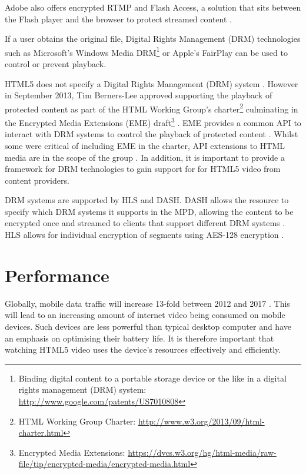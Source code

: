 \documentclass[journal]{IEEEtran}
\begin{document}
Adobe also offers encrypted RTMP and Flash Access, a solution that sits between the Flash player and the browser to protect streamed content \cite{whitePaper:flashAccess}.

If a user obtains the original file, Digital Rights Management (DRM) technologies such as Microsoft's Windows Media DRM\footnote{Binding digital content to a portable storage device or the like in a digital rights management (DRM) system: \url{http://www.google.com/patents/US7010808}} or Apple's FairPlay can be used to control or prevent playback.

HTML5 does not specify a Digital Rights Management (DRM) system \cite{article:HTML5LeadsAWebRevolution}. However in September 2013, Tim Berners-Lee approved supporting the playback of protected content as part of the HTML Working Group's charter\footnote{HTML Working Group Charter: \url{http://www.w3.org/2013/09/html-charter.html}} culminating in the Encrypted Media Extensions (EME) draft\footnote{Encrypted Media Extensions: \url{https://dvcs.w3.org/hg/html-media/raw-file/tip/encrypted-media/encrypted-media.html}} \cite{email:newHTMLCharter}. EME provides a common API to interact with DRM systems to control the playback of protected content \cite{standard:eme}. Whilst some were critical of including EME in the charter, API extensions to HTML media are in the scope of the group \cite{website:EEFDRM}\cite{email:emeInScope}. In addition, it is important to provide a framework for DRM technologies to gain support for for HTML5 video from content providers.

DRM systems are supported by HLS and DASH. DASH allows the resource to specify which DRM systems it supports in the MPD, allowing the content to be encrypted once and streamed to clients that support different DRM systems \cite{article:MPEGDASH}. HLS allows for individual encryption of segments using AES-128 encryption \cite{techreport:aReviewOfHTTPLiveStreaming}.

\section{Performance}
Globally, mobile data traffic will increase 13-fold between 2012 and 2017 \cite{website:ciscoForecastAndMethodology}. This will lead to an increasing amount of internet video being consumed on mobile devices. Such devices are less powerful than typical desktop computer and  have an emphasis on optimising their battery life. It is therefore important that watching HTML5 video uses the device's resources effectively and efficiently. %
\end{document}
